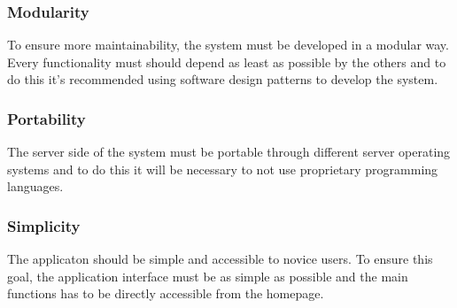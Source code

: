 	\subsubsection{Modularity}
	To ensure more maintainability, the system must be developed in a modular way. Every functionality must should depend as least as possible by the others and to do this it's recommended using software design patterns to develop the system.

	\subsubsection{Portability}
	The server side of the system must be portable through different server operating systems and to do this it will be necessary to not use proprietary programming languages.

	\subsubsection{Simplicity}
	The applicaton should be simple and accessible to novice users. To ensure this goal, the application interface must be as simple as possible and the main functions has to be directly accessible from the homepage.